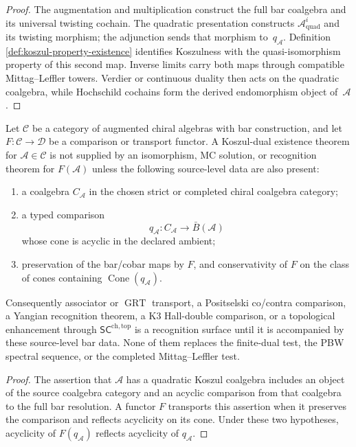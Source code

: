 \begin{proof}
The augmentation and multiplication construct the full bar coalgebra
and its universal twisting cochain.  The quadratic presentation
constructs $\mathcal A^i_{\mathrm{quad}}$ and its twisting morphism;
the adjunction sends that morphism to~$q_{\mathcal A}$.  Definition
\ref{def:koszul-property-existence} identifies Koszulness with the
quasi-isomorphism property of this second map.  Inverse limits carry
both maps through compatible Mittag--Leffler towers.  Verdier or
continuous duality then acts on the quadratic coalgebra, while
Hochschild cochains form the derived endomorphism object of~$\mathcal A$.
\end{proof}

\begin{proposition}
\label{prop:recognition-not-existence}
Let $\mathscr C$ be a category of augmented chiral algebras with bar
construction, and let
$F\colon\mathscr C\to\mathscr D$ be a comparison or transport functor.
A Koszul-dual existence theorem for $\mathcal A\in\mathscr C$ is not
supplied by an isomorphism, MC solution, or recognition theorem for
$F(\mathcal A)$ unless the following source-level data are also
present:
\begin{enumerate}
\item a coalgebra $C_{\mathcal A}$ in the chosen strict or completed
 chiral coalgebra category;
\item a typed comparison
 \[
 q_{\mathcal A}\colon C_{\mathcal A}\longrightarrow\bar B(\mathcal A)
 \]
 whose cone is acyclic in the declared ambient;
\item preservation of the bar/cobar maps by $F$, and conservativity of
 $F$ on the class of cones containing $\operatorname{Cone}(q_{\mathcal A})$.
\end{enumerate}
Consequently associator or $\operatorname{GRT}$ transport, a
Positselski co/contra comparison, a Yangian recognition theorem, a K3
Hall-double comparison, or a topological enhancement through
$\mathsf{SC}^{\mathrm{ch,top}}$ is a recognition surface until it is
accompanied by these source-level bar data. None of them replaces the
finite-dual test, the PBW spectral sequence, or the completed
Mittag--Leffler test.
\end{proposition}

\begin{proof}
The assertion that $\mathcal A$ has a quadratic Koszul coalgebra
includes an object of the source coalgebra category and an acyclic
comparison from that coalgebra to the full bar resolution.  A functor
$F$ transports this assertion when it preserves the comparison and
reflects acyclicity on its cone.  Under these two hypotheses,
acyclicity of $F(q_{\mathcal A})$ reflects acyclicity of
$q_{\mathcal A}$.
\end{proof}


